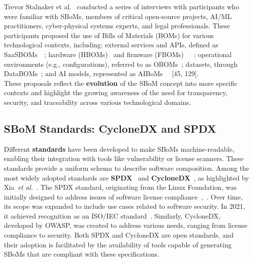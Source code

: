 \documentclass[12pt,a4paper, oneside, openright]{book}
\newcommand{\aiboms}{{AIBoMs}\xspace}
\newcommand{\sbom}{{SBoM}\xspace}
\newcommand{\sboms}{{SBoMs}\xspace}
\newcommand{\etal}{\textit{et al.}\xspace}
\begin{document}
Trevor Stalnaker et al.~\cite{BOMs_Away!} conducted a series of interviews with participants who were familiar with \sboms, members of critical open-source projects, AI/ML practitioners, cyber-physical systems experts, and legal professionals. These participants proposed the use of Bills of Materials (BOMs) for various technological contexts, including:
external services and APIs, defined as SaaSBOMs~\cite{cyclonedx_website}~\cite{CloudSecurityAlliance2022};
hardware (HBOMs)~\cite{CycloneDX2022HBOM} and firmware (FBOMs)~\cite{Nelson2021}~\cite{Costin2022}~\cite{Beer2022};
operational environments (e.g., configurations), referred to as OBOMs~\cite{CycloneDX2022OBOM};
datasets, through DataBOMs~\cite{Barclay2019};
and AI models, represented as \aiboms~\cite{Chan2017}~\cite{Xia2023} [45, 129].\\
These proposals reflect the \textbf{evolution} of the \sbom concept into more specific contexts and highlight the growing awareness of the need for transparency, security, and traceability across various technological domains.

\subsection{\sbom Standards: CycloneDX and SPDX}
Different \textbf{standards} have been developed to make \sboms machine-readable, enabling their integration with tools like vulnerability or license scanners. These standards provide a uniform schema to describe software composition. Among the most widely adopted standards are \textbf{SPDX}~\cite{spdx_website} and \textbf{CycloneDX}~\cite{cyclonedx_website}, as highlighted by Xia~\etal~\cite{10.1109/ICSE48619.2023.00219}.
The SPDX standard, originating from the Linux Foundation, was initially designed to address issues of software license compliance~\cite{10.1145/2950290.2983939},~\cite{10.1016/j.jss.2016.06.064}. Over time, its scope was expanded to include use cases related to software security. In 2021, it achieved recognition as an ISO/IEC standard~\cite{iso_81870}. Similarly, CycloneDX, developed by OWASP, was created to address various needs, ranging from license compliance to security. Both SPDX and CycloneDX are open standards, and their adoption is facilitated by the availability of tools capable of generating \sboms that are compliant with these specifications.
\end{document}
